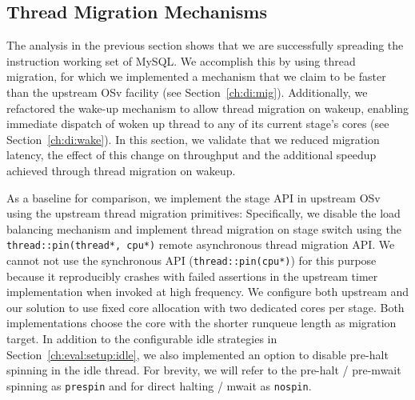 \documentclass[12pt,a4paper]{book}
\begin{document}
\clearpage
\subsection{Thread Migration Mechanisms}\label{ch:eval:mig}

The analysis in the previous section shows that we are successfully spreading the instruction working set of MySQL.
We accomplish this by using thread migration, for which we implemented a mechanism that we claim to be faster than the upstream OSv facility (see Section~\ref{ch:di:mig}).
Additionally, we refactored the wake-up mechanism to allow thread migration on wakeup, enabling immediate dispatch of woken up thread to any of its current stage's cores (see Section~\ref{ch:di:wake}).
In this section, we validate that we reduced migration latency, the effect of this change on throughput and the additional speedup achieved through thread migration on wakeup.

As a baseline for comparison, we implement the stage API in upstream OSv using the upstream thread migration primitives:
Specifically, we disable the load balancing mechanism and implement thread migration on stage switch using the \lstinline[style=figurecpp]{thread::pin(thread*, cpu*)} remote asynchronous thread migration API.
We cannot not use the synchronous API (\lstinline[style=figurecpp]{thread::pin(cpu*)}) for this purpose because it reproducibly crashes with failed assertions in the upstream timer implementation when invoked at high frequency.
We configure both upstream and our solution to use fixed core allocation with two dedicated cores per stage.
Both implementations choose the core with the shorter runqueue length as migration target.
In addition to the configurable idle strategies in Section~\ref{ch:eval:setup:idle}, we also implemented an option to disable pre-halt spinning in the idle thread.
For brevity, we will refer to the pre-halt / pre-mwait spinning as \texttt{prespin} and for direct halting / mwait as \texttt{nospin}.
\end{document}
